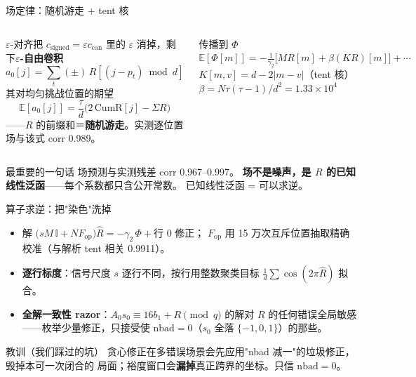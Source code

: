 \documentclass[11pt,aspectratio=169]{ctexbeamer}
\begin{document}
\begin{frame}{场定律：随机游走 + tent 核}
  \begin{columns}[T]
    \small
    $\varepsilon$-对齐把 $c_{\mathrm{signed}}=\varepsilon c_{\mathrm{can}}$
    里的 $\varepsilon$ 消掉，剩下\textbf{$\varepsilon$-自由卷积}
    \[
      a_0[j] = \textstyle\sum_t (\pm)\,R[(j-p_t)\bmod d]
    \]
    其对均匀挑战位置的期望
    \[
      \mathbb{E}[a_0[j]] = \frac{\tau}{d}\bigl(2\,\mathrm{CumR}[j]-\Sigma R\bigr)
    \]
    ——$R$ 的前缀和＝\textbf{随机游走}。实测逐位置场与该式 corr 0.989。
    \begin{exampleblock}{传播到 $\Phi$}
      \small $\mathbb{E}[\Phi[m]] = -\frac{1}{\gamma_2}\bigl[M R[m] +
      \beta (KR)[m]\bigr] + \cdots$\\[0.2em]
      $K[m,v] = d - 2|m-v|$（tent 核）\\
      $\beta = N\tau(\tau-1)/d^2 = 1.33\times10^4$
    \end{exampleblock}
  \end{columns}
  \vspace{0.25em}
  \begin{block}{最重要的一句话}
    \small 场预测与实测残差 corr 0.967--0.997。
    \textbf{场不是噪声，是 $R$ 的已知线性泛函}——每个系数都只含公开常数。
    \textcolor{ravbronze}{已知线性泛函 = 可以求逆。}
  \end{block}
\end{frame}

\begin{frame}{算子求逆：把"染色"洗掉}
  \begin{itemize}
    \item 解 $\bigl(sM\,\mathbb{I} + N F_{\mathrm{op}}\bigr)\hat R
          = -\gamma_2\,\Phi + \text{行 0 修正}$；
          $F_{\mathrm{op}}$ 用 15 万次互斥位置抽取精确校准（与解析 tent 相关 0.9911）。
    \item \textbf{逐行标度}：信号尺度 $s$ 逐行不同，按行用整数聚类目标
          $\frac1d\sum\cos(2\pi\hat R)$ 拟合。
    \item \textbf{全解一致性 razor}：$A_0 s_0 \equiv 16b_1 + R \pmod q$ 的解对
          $R$ 的任何错误全局敏感——枚举少量修正，只接受使
          $\mathrm{nbad}=0$（$s_0$ 全落 $\{-1,0,1\}$）的那些。
  \end{itemize}
  \begin{alertblock}{教训（我们踩过的坑）}
    \small 贪心修正在多错误场景会先应用"nbad 减一"的垃圾修正，毁掉本可一次闭合的
    局面；裕度窗口会\textbf{漏掉}真正跨界的坐标。只信 $\mathrm{nbad}=0$。
  \end{alertblock}
\end{frame}
\end{document}
